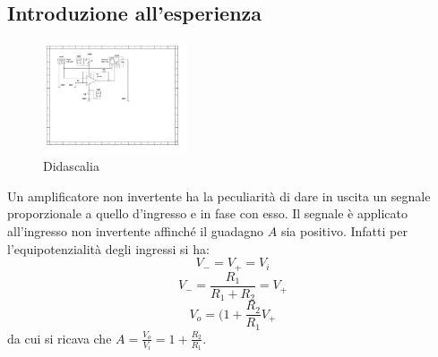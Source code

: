 \documentclass[journal]{IEEEtran}
\begin{document}
\subsection{\textbf{Introduzione all'esperienza}}
\begin{figure}[H]%
\begin {center}
\includegraphics[width=0.38\textwidth]{sch-simulations/output/OPA-closed-loop-non-inverting.pdf}
\caption{Didascalia}
\label{fig:oscilloscope}
\end {center}
\end{figure}
Un amplificatore non invertente ha la peculiarità di dare in uscita un segnale proporzionale a quello d'ingresso e in fase con esso. Il segnale è applicato all'ingresso non invertente affinché il guadagno $A$ sia positivo. Infatti per l'equipotenzialità degli ingressi si ha: \[V_{-} = V_{+} = V_{i}\] \[V_{-} = \frac{R_1}{R_1+R_2}=V_{+}\] \[V_{o}=(1+\frac{R_2}{R_1}V_{+}\]
da cui si ricava che $A=\frac{V_{o}}{V_i}=1+\frac{R_2}{R_1}$.
\end{document}

